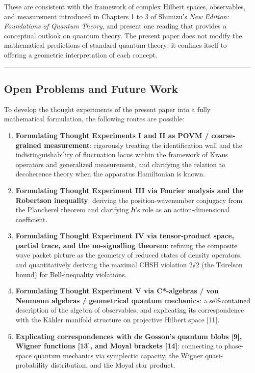 \documentclass[
  11pt,
]{article}
\providecommand{\tightlist}{%
  \setlength{\itemsep}{0pt}\setlength{\parskip}{0pt}}
\begin{document}
These are consistent with the framework of complex Hilbert spaces,
observables, and measurement introduced in Chapters 1 to 3 of Shimizu's
\emph{New Edition: Foundations of Quantum Theory}, and present one
reading that provides a conceptual outlook on quantum theory. The
present paper does not modify the mathematical predictions of standard
quantum theory; it confines itself to offering a geometric
interpretation of each concept.

\begin{center}\rule{0.5\linewidth}{0.5pt}\end{center}

\subsection{Open Problems and Future
Work}\label{open-problems-and-future-work}

To develop the thought experiments of the present paper into a fully
mathematical formulation, the following routes are possible:

\begin{enumerate}
\def\labelenumi{\arabic{enumi}.}
\tightlist
\item
  \textbf{Formulating Thought Experiments I and II as POVM /
  coarse-grained measurement}: rigorously treating the identification
  wall and the indistinguishability of fluctuation locus within the
  framework of Kraus operators and generalized measurement, and
  clarifying the relation to decoherence theory when the apparatus
  Hamiltonian is known.
\item
  \textbf{Formulating Thought Experiment III via Fourier analysis and
  the Robertson inequality}: deriving the position-wavenumber conjugacy
  from the Plancherel theorem and clarifying ℏ's role as an
  action-dimensional coefficient.
\item
  \textbf{Formulating Thought Experiment IV via tensor-product space,
  partial trace, and the no-signalling theorem}: refining the composite
  wave packet picture as the geometry of reduced states of density
  operators, and quantitatively deriving the maximal CHSH violation 2√2
  (the Tsirelson bound) for Bell-inequality violations.
\item
  \textbf{Formulating Thought Experiment V via C*-algebras / von Neumann
  algebras / geometrical quantum mechanics}: a self-contained
  description of the algebra of observables, and explicating its
  correspondence with the Kähler manifold structure on projective
  Hilbert space {[}11{]}.
\item
  \textbf{Explicating correspondences with de Gosson's quantum blobs
  {[}9{]}, Wigner functions {[}13{]}, and Moyal brackets {[}14{]}}:
  connecting to phase-space quantum mechanics via symplectic capacity,
  the Wigner quasi-probability distribution, and the Moyal star product.
\end{enumerate}
\end{document}
